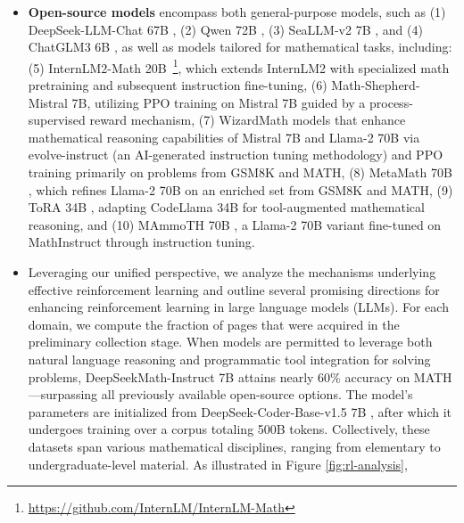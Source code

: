\begin{itemize}[topsep=0pt]
\subsubsection{Outcome Supervision RL with GRPO} 
To formally describe, for each input $q$, the previous policy $\pi_{\theta_{old}}$ generates a set of $G$ outputs $\{o_1, o_2, \cdots, o_G\}$. In reinforcement learning, this role is typically assumed by a neural reward model. English test suites include GSM8K \citep{gsm8k}, MATH \citep{MATH}, SAT \citep{llemma}, OCW Courses \citep{minerva}, and MMLU-STEM \citep{mmlu}, while Chinese benchmarks comprise MGSM-zh \citep{mgsm}, CMATH \citep{wei2023cmath}, Gaokao-MathCloze \citep{agieval}, and Gaokao-MathQA \citep{agieval}. The entirety of our experiments employs the lightweight and efficient HAI-LLM \citep{haillm} training infrastructure. Within the context of LLMs, the reward model is commonly configured to provide a scalar reward only for the terminal token, introducing challenges when training a value function to be precise for each token position. \item \textbf{Open-source models} encompass both general-purpose models, such as (1) DeepSeek-LLM-Chat 67B \citep{deepseek-llm}, (2) Qwen 72B \citep{qwen}, (3) SeaLLM-v2 7B \citep{seallm}, and (4) ChatGLM3 6B \citep{chatglm3}, as well as models tailored for mathematical tasks, including: (5) InternLM2-Math 20B~\footnote{\url{https://github.com/InternLM/InternLM-Math}}, which extends InternLM2 with specialized math pretraining and subsequent instruction fine-tuning, (6) Math-Shepherd-Mistral 7B, utilizing PPO training \citep{schulman2017proximal} on Mistral 7B \citep{mistral} guided by a process-supervised reward mechanism, (7) WizardMath models \citep{wizardmath} that enhance mathematical reasoning capabilities of Mistral 7B and Llama-2 70B \citep{llama2} via evolve-instruct (an AI-generated instruction tuning methodology) and PPO training primarily on problems from GSM8K and MATH, (8) MetaMath 70B \citep{metamath}, which refines Llama-2 70B on an enriched set from GSM8K and MATH, (9) ToRA 34B \cite{tora}, adapting CodeLlama 34B for tool-augmented mathematical reasoning, and (10) MAmmoTH 70B \citep{MathInstruct}, a Llama-2 70B variant fine-tuned on MathInstruct through instruction tuning. \item Leveraging our unified perspective, we analyze the mechanisms underlying effective reinforcement learning and outline several promising directions for enhancing reinforcement learning in large language models (LLMs). For each domain, we compute the fraction of pages that were acquired in the preliminary collection stage. When models are permitted to leverage both natural language reasoning and programmatic tool integration for solving problems, DeepSeekMath-Instruct 7B attains nearly 60\% accuracy on MATH—surpassing all previously available open-source options. The model's parameters are initialized from DeepSeek-Coder-Base-v1.5 7B \citep{deepseek-coder}, after which it undergoes training over a corpus totaling 500B tokens. Collectively, these datasets span various mathematical disciplines, ranging from elementary to undergraduate-level material. As illustrated in Figure \ref{fig:rl-analysis}, 
\end{itemize}
